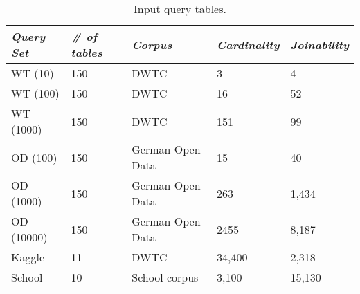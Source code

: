 \begin{table}[]
    \scriptsize
    \centering
    \caption{Input query tables.}
    \label{tab:queries}
\begin{tabular}{l|l|l|l|l}
\textit{\textbf{Query Set}} & \textit{\textbf{\# of tables}} & \textit{\textbf{Corpus}} & \textit{\textbf{Cardinality}} & \textit{\textbf{Joinability}} \\ \toprule

WT (10) & 150 & DWTC & 3 & 4 \\
WT (100) & 150 & DWTC & 16 & 52 \\
WT (1000) & 150 & DWTC & 151 & 99 \\
OD (100) & 150 & German Open Data & 15 & 40 \\
OD (1000) & 150 & German Open Data & 263 & 1,434 \\
OD (10000) & 150 & German Open Data & 2455 & 8,187 \\
Kaggle & 11 & DWTC & 34,400 & 2,318 \\
School & 10  & School corpus & 3,100 & 15,130 \\

\end{tabular}
\end{table}
